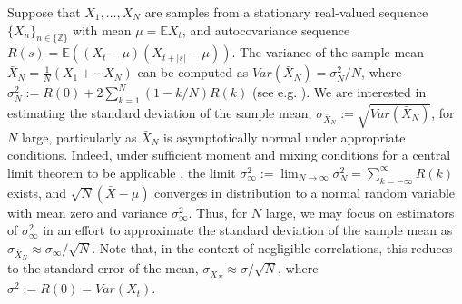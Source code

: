 \documentclass[onecolumn,12pt]{iopart}
\newcommand{\ZZ}{\mathbb{Z}}
\newcommand{\E}{\mathbb{E}}
\begin{document}
Suppose that $X_1,\ldots,X_N$ are samples from a stationary real-valued sequence $\{X_n\}_{n\in\{\ZZ\}}$ with mean $\mu = \E X_t$, and autocovariance sequence
$R(s) = \E\left((X_t - \mu)(X_{t+|s|}-\mu)\right)$.  The variance of the sample mean $\bar{X}_{N}=\frac{1}{N}(X_{1}+\cdots X_{N})$ can be computed as 
$Var(\bar{X}_{N}) = \sigma_{N}^{2}/N$, where $\sigma_{N}^{2}:= R(0) + 2\sum_{k=1}^{N}(1-k/N)R(k)$ (see e.g. \cite{smith2018}).  We are interested in estimating the standard deviation of the sample mean, $\sigma_{\bar{X}_{N}}:=\sqrt{Var(\bar{X}_{N}) }$, for $N$ large, particularly as $\bar{X}_{N}$ is asymptotically normal under appropriate conditions.  Indeed, under sufficient moment and mixing conditions for a central limit theorem to be applicable \cite{rosenblatt2012}, the limit 
$\sigma_{\infty}^{2} := \lim_{N\rightarrow \infty}\sigma_{N}^{2} = \sum_{k=-\infty}^{\infty}R(k)$ exists, and $\sqrt{N}(\bar{X} - \mu)$ converges in distribution to a normal random variable with mean zero and variance $\sigma_{\infty}^{2}$.  Thus, for $N$ large, we may focus on estimators of $\sigma_{\infty}^{2}$ in an effort to approximate the standard deviation of the sample mean as $\sigma_{\bar{X}_{N}} \approx \sigma_{\infty}/\sqrt{N}$.  Note that, in the context of negligible correlations, this reduces to the standard error of the mean, $\sigma_{\bar{X}_{N}} \approx \sigma/\sqrt{N}$, where $\sigma^2 := R(0) = Var(X_t)$.
\end{document}
